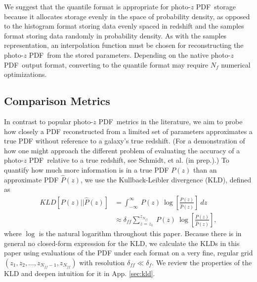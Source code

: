 \documentclass[\docopts]{\docclass}
\newcommand{\pz}{photo-$z$ PDF}
\begin{document}
We suggest that the quantile format is appropriate for \pz\ storage because it 
allocates storage evenly in the space of probability density, as opposed to the 
histogram format storing data evenly spaced in redshift and the samples format 
storing data randomly in probability density.  As with the samples 
representation, an interpolation function must be chosen for reconstructing the 
\pz\ from the stored parameters.  Depending on the native \pz\ output format, 
converting to the quantile format may require $N_{f}$ numerical optimizations.





\subsection{Comparison Metrics}
\label{sec:metric}

In contrast to popular \pz\ metrics in the literature, we aim to probe how 
closely a PDF reconstructed from a limited set of parameters approximates a 
true PDF without reference to a galaxy's true redshift.  (For a demonstration 
of how one might approach the different problem of evaluating the accuracy of a 
\pz\ relative to a true redshift, see Schmidt, et al. (in prep.).)  To quantify 
how much more information is in a true PDF $P(z)$ than an approximate PDF 
$\hat{P}(z)$, we use the Kullback-Leibler divergence (KLD), defined as
\begin{align}
  \label{eq:kld}
  KLD[P(z) || \hat{P}(z)] &= \int_{-\infty}^{\infty}\ P(z)\ 
\log\left[\frac{P(z)}{\hat{P}(z)}\right]\ dz\\
  &\approx \delta_{ff}\sum_{z=z_{1}}^{z_{N_{ff}}}\ P(z)\ 
\log\left[\frac{P(z)}{\hat{P}(z)}\right],
\end{align}
where $\log$ is the natural logarithm throughout this paper.  Because there is 
in general no closed-form expression for the KLD, we calculate the KLDs in this 
paper using evaluations of the PDF under each format on a very fine, regular 
grid $(z_{1}, z_{2}, \dots, z_{N_{ff}-1}, z_{N_{ff}})$ with resolution 
$\delta_{ff}\ll\delta_{f}$.  We review the properties of the KLD and deepen 
intuition for it in App. \ref{sec:kld}.
\end{document}
